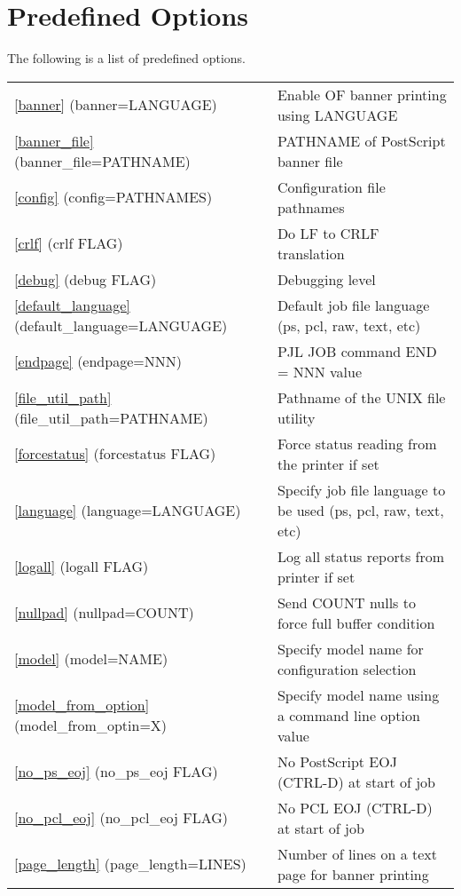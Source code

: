 \documentclass[a4paper]{article}
\begin{document}
\section{Predefined Options}

The following is a list of predefined options.
\begin{table}[tbp]
\begin{center}
\begin{tabular}{ll}
{\ttfamily \ref{banner} {(banner=LANGUAGE)}}&  Enable OF banner printing using LANGUAGE\\ 
{\ttfamily \ref{banner_file} {(banner\_file=PATHNAME)}}&  PATHNAME of PostScript banner file\\ 
{\ttfamily \ref{config} {(config=PATHNAMES)}}&  Configuration file pathnames\\ 
{\ttfamily \ref{crlf} {(crlf FLAG)}}&  Do LF to CRLF translation\\ 
{\ttfamily \ref{debug} {(debug FLAG)}}&  Debugging level\\ 
{\ttfamily \ref{default_language} {(default\_language=LANGUAGE)}}&  Default job file language (ps, pcl, raw, text, etc)\\ 
{\ttfamily \ref{endpage} {(endpage=NNN)}}&  PJL JOB command END = NNN value\\ 
{\ttfamily \ref{file_util_path} {(file\_util\_path=PATHNAME)}}&  Pathname of the UNIX file utility\\ 
{\ttfamily \ref{forcestatus} {(forcestatus FLAG)}}&  Force status reading from the printer if set\\ 
{\ttfamily \ref{language} {(language=LANGUAGE)}}&  Specify job file language to be used (ps, pcl, raw, text, etc)\\ 
{\ttfamily \ref{logall} {(logall FLAG)}}&  Log all status reports from printer if set\\ 
{\ttfamily \ref{nullpad} {(nullpad=COUNT)}}&  Send COUNT nulls to force full buffer condition\\ 
{\ttfamily \ref{model} {(model=NAME)}}&  Specify model name for configuration selection\\ 
{\ttfamily \ref{model_from_option} {(model\_from\_optin=X)}}&  Specify model name using a command line option value\\ 
{\ttfamily \ref{no_ps_eoj} {(no\_ps\_eoj FLAG)}}&  No PostScript EOJ (CTRL-D) at start of job\\ 
{\ttfamily \ref{no_pcl_eoj} {(no\_pcl\_eoj FLAG)}}&  No PCL EOJ (CTRL-D) at start of job\\ 
{\ttfamily \ref{page_length} {(page\_length=LINES)}}&  Number of lines on a text page for banner printing\\ 

\end{tabular}
\end{center}
\end{table}
\end{document}
